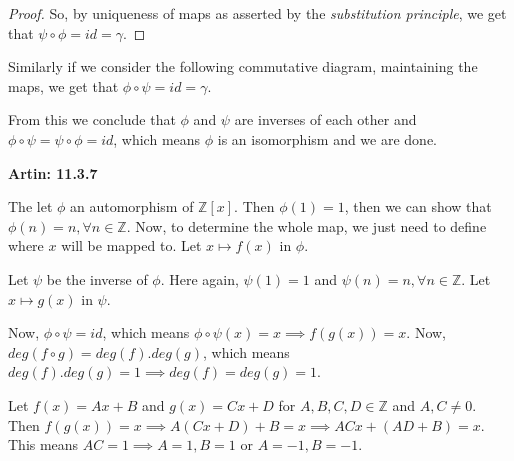 \documentclass[12pt,a4paper]{article}
\theoremstyle{definition}
\begin{document}
\begin{flushleft}
\begin{proof}
	\medskip

	So, by uniqueness of maps as asserted by the {\it substitution principle}, we get that $\psi \circ \phi = id = \gamma$.
\end{proof}

\newpage

Similarly if we consider the following commutative diagram, maintaining the maps, we get that $\phi \circ \psi = id = \gamma$.

\medskip


\medskip

From this we conclude that $\phi$ and $\psi$ are inverses of each other and $\phi \circ \psi = \psi \circ \phi = id$, which means $\phi$ is an isomorphism and we are done.

\bigskip

{\bf Artin: 11.3.7}

The let $\phi$ an automorphism of $\mathbb{Z}[x]$. Then $\phi (1) = 1$, then we can show that $\phi (n) = n, \forall n \in \mathbb{Z}$. Now, to determine the whole map, we just need to define where $x$ will be mapped to. Let $x \mapsto f(x)$ in $\phi$.

\medskip

Let $\psi$ be the inverse of $\phi$. Here again, $\psi (1) = 1$ and  $\psi (n) = n, \forall n \in \mathbb{Z}$. Let $x \mapsto g(x)$ in $\psi$.

\medskip

Now, $\phi \circ \psi = id$, which means $\phi \circ \psi (x) = x \implies f (g (x))= x$. Now, $deg(f \circ g) = deg(f).deg(g) $, which means $deg(f).deg(g) = 1 \implies deg(f) = deg(g) = 1$. 

Let $f(x) = Ax + B$ and $g(x) = Cx + D$ for $A,B,C,D \in \mathbb{Z}$ and $A,C \ne 0$. Then $f(g(x)) = x \implies A(Cx +D) + B = x \implies AC x + (AD + B) = x$. This means $AC = 1 \implies A = 1, B = 1 \text{ or } A = -1, B = -1$.

\medskip


\end{flushleft}
\end{document}
